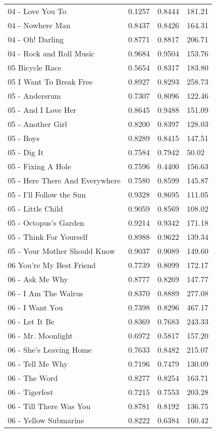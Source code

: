 \begin{longtable}[c]{|l|c|l|l|}
04 - Love You To & 0.1257 & 0.8444 & 181.21 \\
04 - Nowhere Man & 0.8437 & 0.8426 & 164.31 \\
04 - Oh! Darling & 0.8771 & 0.8817 & 206.71 \\
04 - Rock and Roll Music & 0.9684 & 0.9504 & 153.76 \\
05 Bicycle Race & 0.5654 & 0.8317 & 183.80 \\
05 I Want To Break Free & 0.8927 & 0.8293 & 258.73 \\
05 - Andersrum & 0.7307 & 0.8096 & 122.46 \\
05 - And I Love Her & 0.8645 & 0.9488 & 151.09 \\
05 - Another Girl & 0.8200 & 0.8397 & 128.03 \\
05 - Boys & 0.8289 & 0.8415 & 147.51 \\
05 - Dig It & 0.7584 & 0.7942 & 50.02 \\
05 - Fixing A Hole & 0.7596 & 0.4400 & 156.63 \\
05 - Here  There And Everywhere & 0.7580 & 0.8599 & 145.87 \\
05 - I'll Follow the Sun & 0.9328 & 0.8695 & 111.05 \\
05 - Little Child & 0.9059 & 0.8569 & 108.02 \\
05 - Octopus's Garden & 0.9214 & 0.9342 & 171.18 \\
05 - Think For Yourself & 0.8988 & 0.9622 & 139.34 \\
05 - Your Mother Should Know & 0.9037 & 0.9089 & 149.60 \\
06 You're My Best Friend & 0.7739 & 0.8099 & 172.17 \\
06 - Ask Me Why & 0.8777 & 0.8269 & 147.77 \\
06 - I Am The Walrus & 0.8370 & 0.8889 & 277.08 \\
06 - I Want You & 0.7398 & 0.8296 & 467.17 \\
06 - Let It Be & 0.8369 & 0.7683 & 243.33 \\
06 - Mr. Moonlight & 0.6972 & 0.5817 & 157.20 \\
06 - She's Leaving Home & 0.7633 & 0.8482 & 215.07 \\
06 - Tell Me Why & 0.7196 & 0.7479 & 130.09 \\
06 - The Word & 0.8277 & 0.8254 & 163.71 \\
06 - Tigerfest & 0.7215 & 0.7553 & 203.28 \\
06 - Till There Was You & 0.8781 & 0.8192 & 136.75 \\
06 - Yellow Submarine & 0.8222 & 0.6384 & 160.42 \\

\end{longtable}
